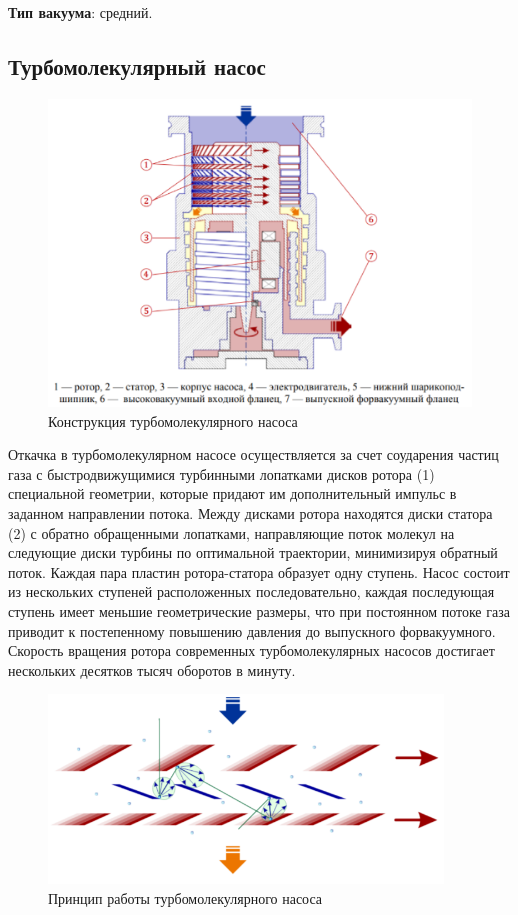 \documentclass[a4paper, 12pt]{article} %
\begin{document}
\textbf{Тип вакуума}: средний.

\subsection{Турбомолекулярный насос}

\begin{figure}[h]
    \centering
    \includegraphics[width = 12 cm]{3}
    \caption{Конструкция турбомолекулярного насоса}
    \label{fig:vac}
\end{figure}

Откачка в турбомолекулярном насосе осуществляется за
счет соударения частиц газа с быстродвижущимися турбинными лопатками дисков ротора (1) специальной геометрии, которые придают им дополнительный импульс в заданном направлении потока. Между дисками ротора находятся диски статора (2) с обратно обращенными лопатками, направляющие поток молекул на следующие диски турбины по оптимальной траектории, минимизируя обратный поток. Каждая пара пластин ротора-статора образует одну ступень. Насос состоит из нескольких ступеней расположенных последовательно, каждая последующая ступень имеет меньшие геометрические размеры, что при постоянном потоке
газа приводит к постепенному повышению давления до выпускного форвакуумного. Скорость вращения ротора современных турбомолекулярных
насосов достигает нескольких десятков тысяч оборотов в минуту.

\begin{figure}[h]
    \centering
    \includegraphics[width = 10.5 cm]{4}
    \caption{Принцип работы турбомолекулярного насоса}
    \label{fig:vac}
\end{figure}
\end{document}
